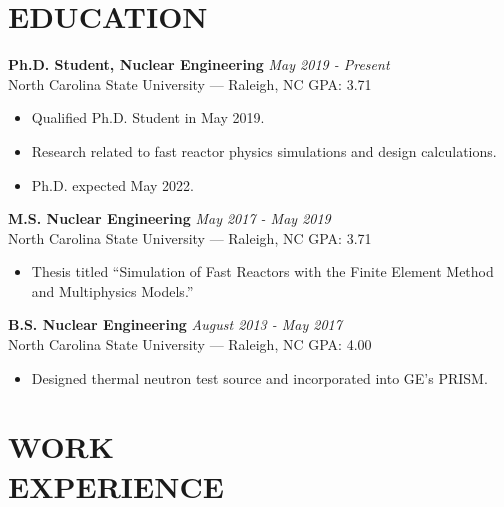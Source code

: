 \documentclass[margin, 10pt]{res}
\newcommand{\backwardspace}{-8pt}
\begin{document}
\begin{resume}


\vspace{-12pt}
 
\section{EDUCATION}  
\textbf{Ph.D. Student, Nuclear Engineering} \hfill 
  \textit{May 2019 - Present}\\
North Carolina State University --- Raleigh, NC \hfill GPA: 3.71
\begin{itemize}
    \item Qualified Ph.D. Student in May 2019.
    \item Research related to fast reactor physics simulations and design calculations.
    \item Ph.D. expected May 2022.
\end{itemize}
\vspace{\backwardspace}
\textbf{M.S. Nuclear Engineering} \hfill \textit{May 2017 - May 2019} \\
North Carolina State University --- Raleigh, NC \hfill GPA: 3.71
\begin{itemize}
  \item Thesis titled ``Simulation of Fast Reactors with the Finite Element Method and Multiphysics Models.''
\end{itemize}
\vspace{\backwardspace}
\textbf{B.S. Nuclear Engineering} \hfill \textit{August 2013 - May 2017} \\
North Carolina State University --- Raleigh, NC \hfill GPA: 4.00
\begin{itemize}
    \item Designed thermal neutron test source and incorporated into GE's PRISM.
\end{itemize}

 
\section{WORK \\ EXPERIENCE}


\end{resume}
\end{document}
